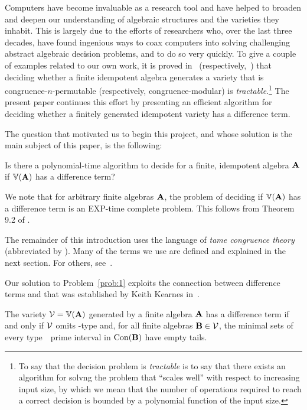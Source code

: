 Computers have become invaluable as a research tool and have helped to
broaden and deepen our understanding of algebraic structures and the
varieties they inhabit.  This is largely due to the efforts
of researchers who, over the last three decades, have found ingenious
ways to coax computers into solving challenging abstract algebraic
decision problems, and to do so very quickly.
To give a couple of examples related to our own work,
it is proved in~\cite{MR3239624} (respectively,~\cite{Freese:2009})
that deciding whether a finite idempotent algebra generates a variety that is congruence-$n$-permutable
(respectively, congruence-modular) is \emph{tractable}.\footnote{To
  say that the decision problem is \emph{tractable} is to say
  that there exists an algorithm for solvng the problem that ``scales
  well'' with respect to increasing input size, by which we mean that
  the number of operations required to reach a correct decision is
  bounded by a polynomial function of the input size.}
The present paper continues this effort by presenting an efficient
algorithm for deciding whether a finitely generated idempotent variety has a
difference term.

The question that motivated us to begin this project, and
whose solution is the main subject of this paper, is the following:
\begin{prob}
  \label{prob:1}
  Is there a polynomial-time algorithm to decide for a finite,
  idempotent algebra $\mathbf{A}$ if $\operatorname{\mathbb{V}}(\mathbf{A})$ has a difference term?
\end{prob}

We note that for arbitrary finite algebras $\mathbf{A}$, the problem of deciding if $\operatorname{\mathbb{V}}(\mathbf{A})$ has a difference term is an EXP-time complete problem.  This follows from Theorem 9.2 of \cite{Freese:2009}.

The remainder of this introduction uses the language of \emph{tame congruence theory} (abbreviated by \tct).  Many of the terms we use are defined and explained
in the next section.  For others, see~\cite{HM:1988}.

Our solution to Problem~\ref{prob:1} exploits the connection
between difference terms and \tct that was established
by Keith Kearnes in~\cite{MR1358491}.

\begin{theorem}
\label{thm:KearnesThm}
The variety $\mathcal{V} = \operatorname{\mathbb{V}}(\mathbf{A})$ generated by a
finite algebra $\mathbf{A}$ has a difference term  if and only if
$\mathcal{V}$ omits \tct-type \utyp and, for all finite algebras
$\mathbf{B} \in \mathcal{V}$,
the minimal sets of every type~\atyp\ prime interval in
$\operatorname{Con}(\mathbf{B})$ have empty tails.
\end{theorem}

